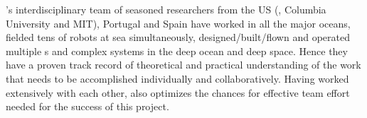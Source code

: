 \proe’s interdisciplinary team of seasoned researchers from the US
(\orge, Columbia University and MIT), Portugal and Spain have worked
in all the major oceans, fielded tens of robots at sea simultaneously,
designed/built/flown and operated multiple \smle s and complex systems
in the deep ocean and deep space. Hence they have a proven track
record of theoretical and practical understanding of the work that
needs to be accomplished individually and collaboratively. Having
worked extensively with each other, also optimizes the chances for
effective team effort needed for the success of this project.

